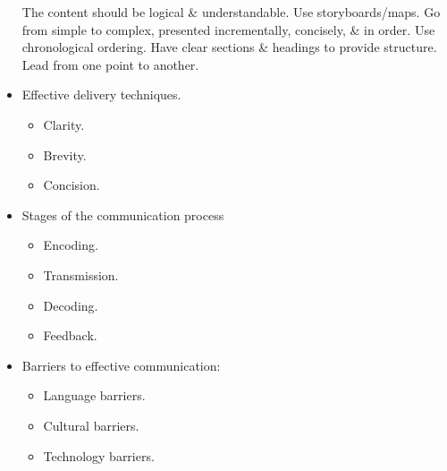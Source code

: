\documentclass[a4paper]{article}
\begin{document}
\begin{itemize}
            The content should be logical \& understandable. Use storyboards/maps.
            Go from simple to complex, presented incrementally, concisely, \& in order.
            Use chronological ordering.
            Have clear sections \& headings to provide structure.
            Lead from one point to another.

    \item   Effective delivery techniques.
            \begin{itemize}
                \item   Clarity.
                \item   Brevity.
                \item   Concision.
            \end{itemize}
    \item   Stages of the communication process
            \begin{itemize}
                \item   Encoding.
                \item   Transmission.
                \item   Decoding.
                \item   Feedback.
            \end{itemize}
    \item   Barriers to effective communication:
            \begin{itemize}
                \item   Language barriers.
                \item   Cultural barriers.
                \item   Technology barriers.
            \end{itemize}
\end{itemize}
\end{document}
